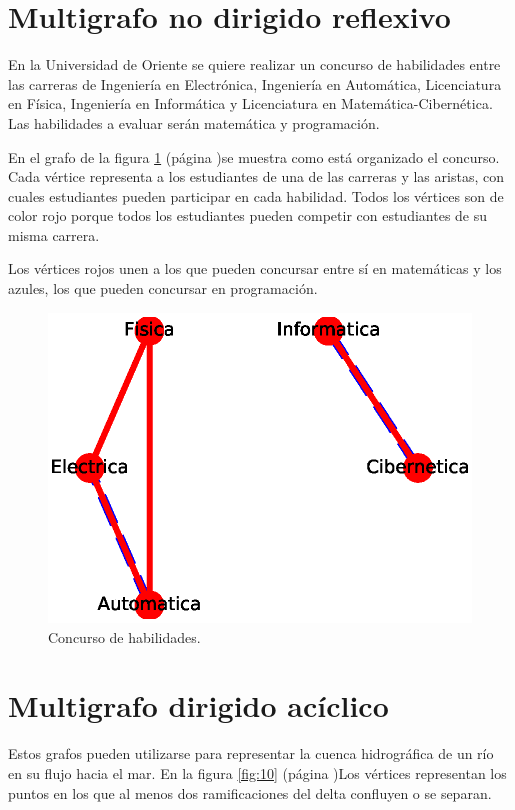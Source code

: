 \documentclass{article}
\begin{document}
\section{Multigrafo no dirigido reflexivo}

En la Universidad de Oriente se quiere realizar un concurso de habilidades entre las carreras de Ingeniería en Electrónica, Ingeniería en Automática, Licenciatura en Física, Ingeniería en Informática y Licenciatura en Matemática-Cibernética. Las habilidades a evaluar serán matemática y programación. 

En el grafo de la figura \ref{fig:9} (página \pageref{fig:9})se muestra como está organizado el concurso. Cada vértice representa a los estudiantes de una de las carreras y las aristas, con cuales estudiantes pueden participar en cada habilidad. Todos los vértices son de color rojo porque todos los estudiantes pueden competir con estudiantes de su misma carrera.

Los vértices rojos unen a los que pueden concursar entre sí en matemáticas y los azules, los que pueden concursar en programación.


\begin{figure}
  \includegraphics[width=.8\columnwidth]{9.eps}
  \vspace*{-8mm}
  \caption{Concurso de habilidades.}
  \label{fig:9}
\end{figure}


\section{Multigrafo dirigido acíclico}

Estos grafos pueden utilizarse para representar la cuenca hidrográfica de un río en su flujo hacia el mar. En la figura \ref{fig:10} (página \pageref{fig:10})Los vértices representan los puntos en los que al menos dos ramificaciones del delta confluyen o se separan.
\end{document}
